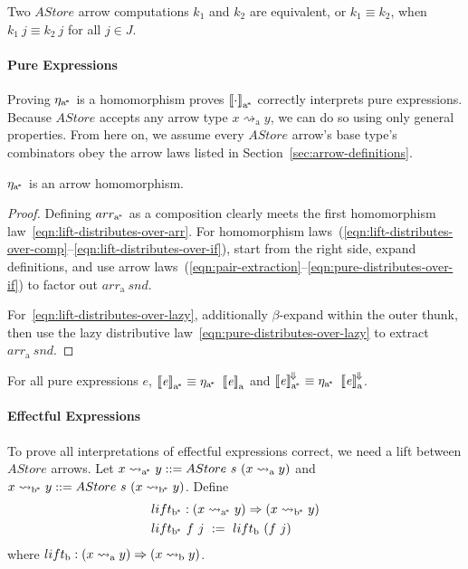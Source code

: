 \documentclass[preprint]{sigplanconf}
\newcommand{\arrow}{\rightsquigarrow}
\newcommand{\conv}{^{\mspace{-2mu}\Downarrow\mspace{-2mu}}}
\newcommand{\meaningofconv}[1]{\left\llbracket{#1}\right\rrbracket\conv}
\newcommand{\arrowlift}{\ensuremath{lift}}
\newcommand{\arrowarr}{\ensuremath{arr}}
\newcommand{\arrowtrans}{\ensuremath{\eta}}
\newcommand{\gen}{_\mathrm{a}}
\newcommand{\genb}{_\mathrm{b}}
\newcommand{\genc}{_\mathrm{a^{\mspace{-2mu}*}}}
\newcommand{\gend}{_\mathrm{b^{\mspace{-2mu}*}}}
\begin{document}
\begin{definition}
Two $AStore$ arrow computations $k_1$ and $k_2$ are equivalent, or $k_1 \equiv k_2$, when $k_1~j \equiv k_2~j$ for all $j \in J$.
\end{definition}

\paragraph{Pure Expressions}
Proving $\arrowtrans\genc$ is a homomorphism proves $\meaningof{\cdot}\genc$ correctly interprets pure expressions.
Because $AStore$ accepts any arrow type $x \arrow\gen y$, we can do so using only general properties.
From here on, we assume every $AStore$ arrow's base type's combinators obey the arrow laws listed in Section~\ref{sec:arrow-definitions}.

\begin{theorem}
$\arrowtrans\genc$ is an arrow homomorphism.
\end{theorem}
\begin{proof}
Defining $\arrowarr\genc$ as a composition clearly meets the first homomorphism law~\eqref{eqn:lift-distributes-over-arr}.
For homomorphism laws~(\ref{eqn:lift-distributes-over-comp}--\ref{eqn:lift-distributes-over-if}), start from the right side, expand definitions, and use arrow laws~(\ref{eqn:pair-extraction}--\ref{eqn:pure-distributes-over-if}) to factor out $\arrowarr\gen~snd$.

For~\eqref{eqn:lift-distributes-over-lazy}, additionally $\beta$-expand within the outer thunk, then use the lazy distributive law~\eqref{eqn:pure-distributes-over-lazy} to extract $\arrowarr\gen~snd$.
\end{proof}

\begin{corollary}
For all pure expressions $\mathit{e}$, $\meaningof{\mathit{e}}\genc \equiv \arrowtrans\genc~\meaningof{\mathit{e}}\gen$ and $\meaningofconv{\mathit{e}}\genc \equiv \arrowtrans\genc~\meaningofconv{\mathit{e}}\gen$.
\label{cor:pure-astore-semantic-correctness}
\end{corollary}

\paragraph{Effectful Expressions} To prove all interpretations of effectful expressions correct, we need a lift between $AStore$ arrows.
Let $x \arrow\genc y ::= AStore~s~(x \arrow\gen y)$ and $x \arrow\gend y ::= AStore~s~(x \arrow\gend y)$.
Define
\begin{equation}
\begin{aligned}
	&\arrowlift\gend : (x \arrow\genc y) \tto (x \arrow\gend y) \\
	&\arrowlift\gend~f~j \ := \ \arrowlift\genb~(f~j)
\end{aligned}
\end{equation}
where $\arrowlift\genb : (x \arrow\gen y) \tto (x \arrow\genb y)$.
\end{document}
